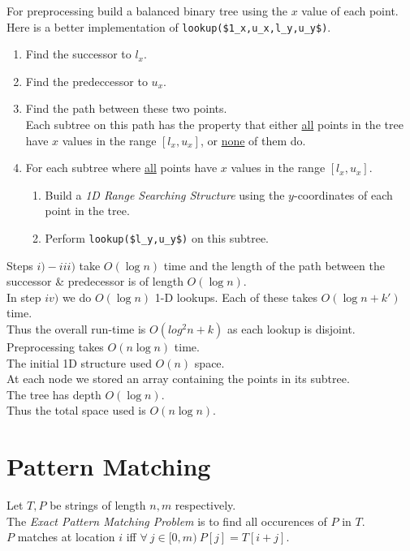 \documentclass[11pt,a4paper]{article}
\begin{document}
For preprocessing build a balanced binary tree using the $x$ value of each point.\\
Here is a better implementation of \lstinline!lookup($1_x,u_x,l_y,u_y$)!.
\begin{enumerate}
	\item Find the successor to $l_x$.
	\item Find the predeccessor to $u_x$.
	\item Find the path between these two points.\\
	Each subtree on this path has the property that either \underline{all} points in the tree have $x$ values in the range $[l_x,u_x]$, or \underline{none} of them do.
	\item For each subtree where \underline{all} points have $x$ values in the range $[l_x,u_x]$.
	\begin{enumerate}
		\item Build a \textit{1D Range Searching Structure} using the $y$-coordinates of each point in the tree.
		\item Perform \lstinline!lookup($l_y,u_y$)! on this subtree.
	\end{enumerate}
\end{enumerate}

Steps $i)-iii)$ take $O(\log n)$ time and the length of the path between the successor \& predecessor is of length $O(\log n)$.\\
In step $iv)$ we do $O(\log n)$ 1-D lookups. Each of these takes $O(\log n+k')$ time.\\
Thus the overall run-time is $O(log^2n+k)$ as each lookup is disjoint.\\
\nb Preprocessing takes $O(n\log n)$ time.\\

The initial 1D structure used $O(n)$ space.\\
At each node we stored an array containing the points in its subtree.\\
The tree has depth $O(\log n)$.\\
Thus the total space used is $O(n\log n)$.

\section{Pattern Matching}

Let $T,P$ be strings of length $n,m$ respectively.\\
The \textit{Exact Pattern Matching Problem} is to find all occurences of $P$ in $T$.\\
$P$ matches at location $i$ iff $\forall\ j\in[0,m)\ P[j]=T[i+j]$.
\end{document}
